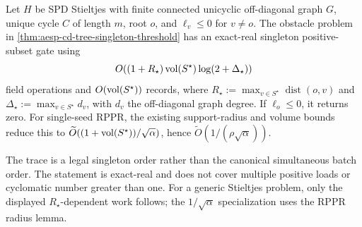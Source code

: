 \begin{corollary}
\label{cor:aesp-cd-unicyclic-singleton}
Let $H$ be SPD Stieltjes with finite connected unicyclic off-diagonal graph
$G$, unique cycle $C$ of length $m$, root $o$, and
$\ell_v\leq0$ for $v\neq o$.  The obstacle problem in
\cref{thm:aesp-cd-tree-singleton-threshold} has an exact-real singleton
positive-subset gate using
\begin{equation}
 O\!\left((1+R_\star)\operatorname{vol}(S^\star)\log(2+\Delta_\star)\right)
 \label{eq:aesp-cd-unicyclic-singleton-work}
\end{equation}
field operations and $O(\operatorname{vol}(S^\star))$ records, where
$R_\star:=\max_{v\in S^\star}\operatorname{dist}(o,v)$ and
$\Delta_\star:=\max_{v\in S^\star}d_v$, with $d_v$ the off-diagonal graph
degree.  If $\ell_o\leq0$, it returns zero.
For single-seed RPPR, the existing support-radius and volume bounds reduce
this to
$\widetilde O((1+\operatorname{vol}(S^\star))/\sqrt\alpha)$, hence
$\widetilde O(1/(\rho\sqrt\alpha))$.

The trace is a legal singleton order rather than the canonical simultaneous
batch order.  The statement is exact-real and does not cover multiple
positive loads or cyclomatic number greater than one.  For a generic
Stieltjes problem, only the displayed $R_\star$-dependent work follows; the
$1/\sqrt\alpha$ specialization uses the RPPR radius lemma.
\end{corollary}


